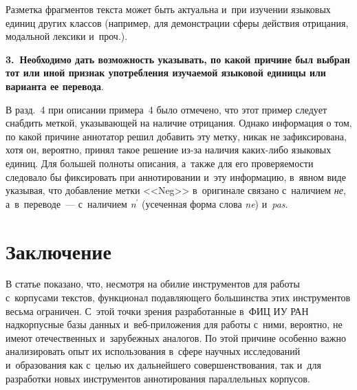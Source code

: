 \begin{multicols}{2}
Разметка фрагментов текста может быть актуальна и~при изучении языковых 
единиц других классов (например, для демонстрации сферы действия отрицания, 
модальной лексики и~проч.).

\textbf{3.\ Необходимо дать возможность указывать, по какой причине 
был выбран тот или иной признак употребления изучаемой языковой 
единицы или варианта ее перевода}.

В разд.~4 при описании примера~4 было отмечено, что этот пример 
следует снабдить меткой, указывающей на наличие отрицания. Однако 
информация о том, по какой причине аннотатор решил добавить эту метку, 
никак не зафиксирована, хотя он, вероятно, принял такое решение из-за 
наличия каких-либо языковых единиц. Для большей полноты описания, 
а~также для его про\-ве\-ря\-емости следовало бы фиксировать при 
аннотировании и~эту информацию, в~явном виде указывая, что до\-бав\-ле\-ние 
метки <<Neg>> в~оригинале связано с~наличием \textit{не}, а~в~переводе~--- 
с~наличием \textit{n}$^\prime$ (усеченная форма слова \textit{ne}) 
и~\textit{pas}.

\section{Заключение}

В статье показано, что, несмотря на обилие инструментов для работы 
с~корпусами текстов, функционал подавляющего большинства этих 
инструментов весьма ограничен. С~этой точки зрения разработанные в~ФИЦ 
ИУ РАН надкорпусные базы данных и~веб-при\-ло\-же\-ния для работы 
с~ними, вероятно, не имеют отечественных и~зарубежных аналогов. По этой 
причине особенно важно анализировать опыт их использования в~сфере 
научных исследований и~образования как с~целью их дальнейшего 
совершенствования, так и~для разработки новых инструментов 
аннотирования параллельных корпусов.


\end{multicols}
